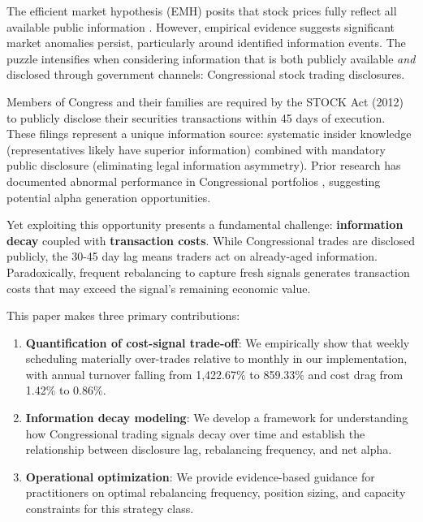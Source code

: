 \documentclass[twocolumn,ieee]{Base_Latex_Template/arithmaxresearch}
\begin{document}
The efficient market hypothesis (EMH) posits that stock prices fully reflect all available public information \cite{fama1970efficient}. However, empirical evidence suggests significant market anomalies persist, particularly around identified information events. The puzzle intensifies when considering information that is both publicly available \textit{and} disclosed through government channels: Congressional stock trading disclosures.

Members of Congress and their families are required by the STOCK Act (2012) to publicly disclose their securities transactions within 45 days of execution. These filings represent a unique information source: systematic insider knowledge (representatives likely have superior information) combined with mandatory public disclosure (eliminating legal information asymmetry). Prior research has documented abnormal performance in Congressional portfolios \cite{ziobrowski2004abnormal, ziobrowski2011house}, suggesting potential alpha generation opportunities.

Yet exploiting this opportunity presents a fundamental challenge: \textbf{information decay} coupled with \textbf{transaction costs}. While Congressional trades are disclosed publicly, the 30-45 day lag means traders act on already-aged information. Paradoxically, frequent rebalancing to capture fresh signals generates transaction costs that may exceed the signal's remaining economic value.

This paper makes three primary contributions:

\begin{enumerate}
\item \textbf{Quantification of cost-signal trade-off}: We empirically show that weekly scheduling materially over-trades relative to monthly in our implementation, with annual turnover falling from 1,422.67\% to 859.33\% and cost drag from 1.42\% to 0.86\%.

\item \textbf{Information decay modeling}: We develop a framework for understanding how Congressional trading signals decay over time and establish the relationship between disclosure lag, rebalancing frequency, and net alpha.

\item \textbf{Operational optimization}: We provide evidence-based guidance for practitioners on optimal rebalancing frequency, position sizing, and capacity constraints for this strategy class.
\end{enumerate}
\end{document}
